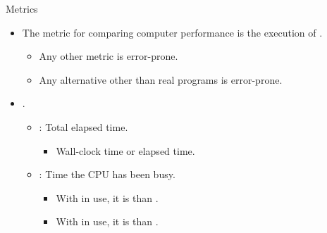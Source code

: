 \begin{frame}[t]{Metrics}
\begin{itemize}
  \item The   metric for comparing computer performance
        is the execution of .
    \begin{itemize}
      \item Any other metric is error-prone.
      \item Any alternative other than real programs is error-prone.
    \end{itemize}

  \item {}.
    \begin{itemize}
      \item {}: 
            Total elapsed time.
        \begin{itemize}
          \item Wall-clock time or elapsed time.
        \end{itemize}

      \item {}: Time the CPU has been busy.
        \begin{itemize}
          \item With  in use, it is 
                than .
          \item With  in use, it is 
                than .
        \end{itemize}
    \end{itemize}
\end{itemize}
\end{frame}

